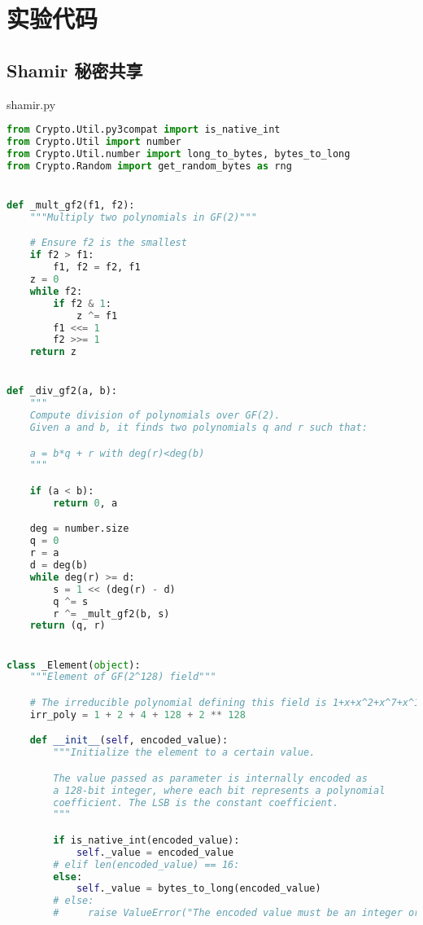 \chapter{实验代码}

\section{Shamir 秘密共享}
\label{appendix:Shamir}

shamir.py

\begin{lstlisting}[language = Python]
from Crypto.Util.py3compat import is_native_int
from Crypto.Util import number
from Crypto.Util.number import long_to_bytes, bytes_to_long
from Crypto.Random import get_random_bytes as rng


def _mult_gf2(f1, f2):
    """Multiply two polynomials in GF(2)"""

    # Ensure f2 is the smallest
    if f2 > f1:
        f1, f2 = f2, f1
    z = 0
    while f2:
        if f2 & 1:
            z ^= f1
        f1 <<= 1
        f2 >>= 1
    return z


def _div_gf2(a, b):
    """
    Compute division of polynomials over GF(2).
    Given a and b, it finds two polynomials q and r such that:

    a = b*q + r with deg(r)<deg(b)
    """

    if (a < b):
        return 0, a

    deg = number.size
    q = 0
    r = a
    d = deg(b)
    while deg(r) >= d:
        s = 1 << (deg(r) - d)
        q ^= s
        r ^= _mult_gf2(b, s)
    return (q, r)


class _Element(object):
    """Element of GF(2^128) field"""

    # The irreducible polynomial defining this field is 1+x+x^2+x^7+x^128
    irr_poly = 1 + 2 + 4 + 128 + 2 ** 128

    def __init__(self, encoded_value):
        """Initialize the element to a certain value.

        The value passed as parameter is internally encoded as
        a 128-bit integer, where each bit represents a polynomial
        coefficient. The LSB is the constant coefficient.
        """

        if is_native_int(encoded_value):
            self._value = encoded_value
        # elif len(encoded_value) == 16:
        else:
            self._value = bytes_to_long(encoded_value)
        # else:
        #     raise ValueError("The encoded value must be an integer or a 16 byte string")


\end{lstlisting}
